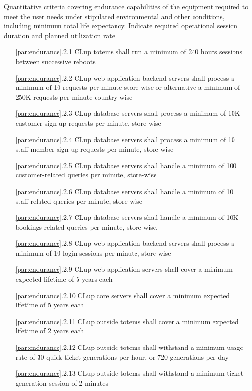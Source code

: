 Quantitative criteria covering endurance capabilities of the equipment required to meet the user needs
under stipulated environmental and other conditions, including minimum total life expectancy. Indicate
required operational session duration and planned utilization rate.
\begin{itemize}[leftmargin=+.8in]
    \item [\ref{par:endurance}.2.1] CLup totems shall run a minimum of 240 hours sessions between successive reboots
    \item [\ref{par:endurance}.2.2] CLup web application backend servers shall process a minimum of 10 requests per minute store-wise or alternative a minimum of 250K requests per minute country-wise
    \item [\ref{par:endurance}.2.3] CLup database servers shall process a minimum of 10K customer sign-up requests per minute, store-wise 
    \item [\ref{par:endurance}.2.4] CLup database servers shall process a minimum of 10 staff member sign-up requests per minute, store-wise
    \item [\ref{par:endurance}.2.5] CLup database servers shall handle a minimum of 100 customer-related queries per minute, store-wise
    \item [\ref{par:endurance}.2.6] CLup database servers shall handle a minimum of 10 staff-related queries per minute, store-wise
    \item [\ref{par:endurance}.2.7] CLup database servers shall handle a minimum of 10K bookings-related queries per minute, store-wise.
    \item [\ref{par:endurance}.2.8] CLup web application backend servers shall process a minimum of 10 login sessions per minute, store-wise 
    \item [\ref{par:endurance}.2.9] CLup web application servers shall cover a minimum expected lifetime of 5 years each
    \item [\ref{par:endurance}.2.10] CLup core servers shall cover a minimum expected lifetime of 5 years each
    \item [\ref{par:endurance}.2.11] CLup outside totems shall cover a minimum expected lifetime of 2 years each
    \item [\ref{par:endurance}.2.12] CLup outside totems shall withstand a minimum usage rate of 30 quick-ticket generations per hour, or 720 generations per day
    \item [\ref{par:endurance}.2.13] CLup outside totems shall withstand a minimum ticket generation session of 2 minutes
    
\end{itemize}

